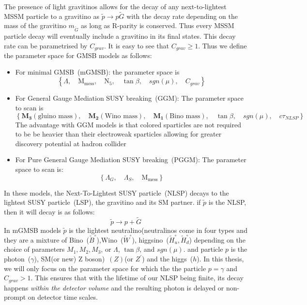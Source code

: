 {The presence of light gravitinos allows for the decay of any next-to-lightest MSSM particle to a gravitino as $\tilde{p}\rightarrow p\tilde{G}$ with the decay rate depending on the mass of the gravitino $m_{\tilde{G}}$ as long as R-parity is conserved. Thus  every MSSM particle decay will eventually include a gravitino in its final states. This decay rate can be parametrised by $C_{grav}$. It is easy to see that $C_{grav} \geq 1$.
Thus we define the parameter space for GMSB models as follows:
\begin{itemize}
\item For minimal GMSB~(mGMSB): the parameter space is 
\begin{equation}\label{mGMSB}
\left\{ \Lambda, \quad \mathrm{M}_{\mbox{mess}},\quad \mathrm{N_{5}}, \quad \tan\beta, \quad sgn(\mu),\quad C_{grav}\right\}
 \end{equation}
 
 \item For General Gauge Mediation SUSY breaking~(GGM): The parameter space to scan is  \cite{PMeade,PMeade1}
 \begin{equation}\label{GGM}
 \left\{\mathbf{M_{3}}(\mbox{gluino mass}), \quad \mathbf{M_{2}}(\mbox{Wino mass}), \quad \mathbf{M_{1}}(\mbox{Bino mass}), \quad \tan\beta, \quad sgn(\mu),\quad c\tau_{NLSP}\right\}
 \end{equation}
The advantage with GGM models is that colored sparticles are not required to be be heavier than their electroweak sparticles allowing for greater discovery potential at hadron collider\cite{DSHIH}
\item For Pure General Gauge Mediation SUSY breaking~(PGGM): The parameter space to scan is:
\begin{equation}\label{PGGM}
\left\{\Lambda_{G},\quad \Lambda_{S}, \quad \mathrm{M}_{\mbox{mess}}\right\}
 \end{equation}
 
\end{itemize}

In these models, the Next-To-Lightest SUSY particle~(NLSP) decays to the lightest SUSY particle~(LSP), the gravitino and its SM partner. if $\tilde{p}$ is the NLSP, then it will decay is as follows:
\begin{equation}
\tilde{p}\rightarrow p + \tilde{G}
\end{equation}
In mGMSB models $\tilde{p}$ is the lightest neutralino(neutralinos come in four types and they are a mixture of Bino~($\tilde{B}^{\circ}$),Wino~($\tilde{W}^{\circ}$),
higgsino~($\tilde{H}^{\circ}_{u},\tilde{H}^{\circ}_{d}$) depending on the choice of parameters $M_{1},M_{2},M_{3}$, or $\Lambda$, $\tan\beta$, and $sgn(\mu)$.
and particle $p$ is the photon~($\gamma$),  SM(or new) Z boson)~$(Z)$(or $Z^{\prime}$) and the higgs~($h$).
In this thesis, we will only focus on the parameter space for which the the particle $p = \gamma$ and $C_{grav} > 1$.
This ensures that with the lifetime of our NLSP being finite, its decay happens \textit{within the detector volume} and the resulting photon is delayed or non-prompt on detector time scales.

}

